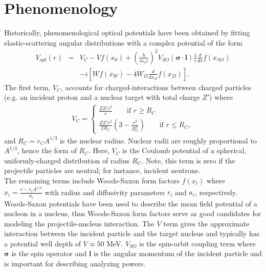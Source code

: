\documentclass[preprintnumbers,floatfix,aps,prc,preprint,nofootinbib]{revtex4-1}
\begin{document}
\section{Phenomenology}
\label{sec:phenomenology}


Historically, phenomenological optical potentials have been obtained by fitting elastic-scattering angular distributions with a complex potential of the form
%
\begin{eqnarray}
	\label{eq:phenomenological_optical_potential}
	V_{opt}(r) &=& V_C - V f(x_0) + (\frac{\hbar}{m_{\pi} c})^2 V_{SO}(\bm{\sigma} \cdot \textbf{l}) \frac{1}{r} \frac{d}{dr} f(x_{SO}) \nonumber \\ 
& &- i [W f(x_W) - 4 W_D \frac{d}{dx_D} f(x_D)].
\end{eqnarray}
%
The first term, $V_C$, accounts for charged-interactions between charged particles (e.g. an incident proton and a nuclear target with total charge $Z'$) where
%
\begin{eqnarray}
	\label{eq:coulomb_potential}
	V_C =
	\begin{cases}
		\frac{Z Z' e^2}{r} \qquad \text{if $r \geq R_C$} \\
		\frac{Z Z' e^2}{2 R_C} (3 - \frac{r^2}{R_C^2}) \qquad \text{if $r \leq R_C$},
	\end{cases}
\end{eqnarray}
%
and $R_C = r_C A^{1/3}$ is the nuclear radius. Nuclear radii are roughly proportional to $A^{1/3}$, hence the form of $R_C$. Here, $V_C$ is the Coulomb potential of a spherical, uniformly-charged distribution of radius $R_C$. Note, this term is zero if the projectile particles are neutral; for instance, incident neutrons.
\\

The remaining terms include Woods-Saxon form factors $f(x_i)$ where $x_i = \frac{r-r_i A^{1/3}}{a_i}$ with radius and diffusivity parameters $r_i$ and $a_i$, respectively. Woods-Saxon potentials have been used to describe the mean field potential of a nucleon in a nucleus, thus Woods-Saxon form factors serve as good candidates for modeling the projectile-nucleus interaction. The $V$ term gives the approximate interaction between the incident particle and the target nucleus and typically has a potential well depth of $V \approx 50$ MeV. $V_{SO}$ is the spin-orbit coupling term where $\bm{\sigma}$ is the spin operator and $\bm{l}$ is the angular momentum of the incident particle and is important for describing analyzing powers.
\\
\end{document}
